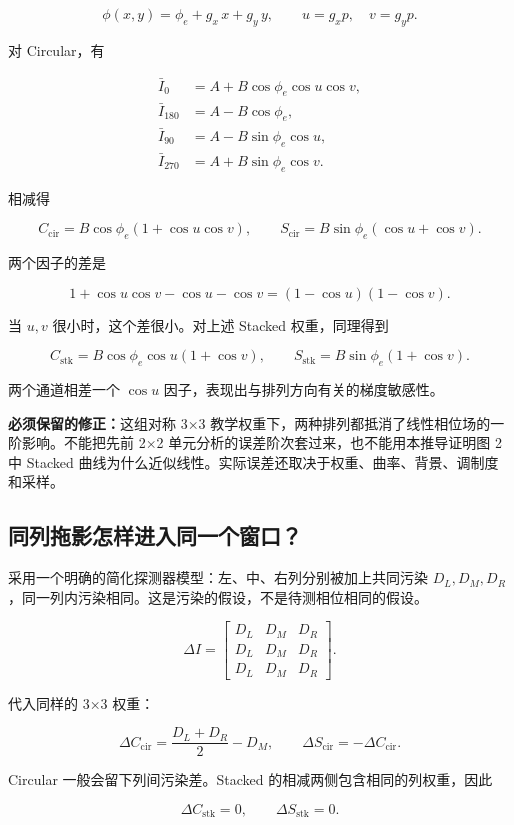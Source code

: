 \documentclass[UTF8,fontset=fandol,11pt,a4paper]{ctexart}
\begin{document}
\[
\phi(x,y)=\phi_e+g_x\,x+g_y\,y,\qquad u=g_xp,\quad v=g_yp.
\]

对 Circular，有

\[
\begin{aligned}
\bar I_0&=A+B\cos\phi_e\cos u\cos v,\\
\bar I_{180}&=A-B\cos\phi_e,\\
\bar I_{90}&=A-B\sin\phi_e\cos u,\\
\bar I_{270}&=A+B\sin\phi_e\cos v.
\end{aligned}
\]

相减得

\[
C_{\mathrm{cir}}=B\cos\phi_e(1+\cos u\cos v),\qquad
S_{\mathrm{cir}}=B\sin\phi_e(\cos u+\cos v).
\]

两个因子的差是

\[
1+\cos u\cos v-\cos u-\cos v=(1-\cos u)(1-\cos v).
\]

当 \(u,v\) 很小时，这个差很小。对上述 Stacked 权重，同理得到

\[
C_{\mathrm{stk}}=B\cos\phi_e\cos u(1+\cos v),\qquad
S_{\mathrm{stk}}=B\sin\phi_e(1+\cos v).
\]

两个通道相差一个 \(\cos u\) 因子，表现出与排列方向有关的梯度敏感性。

\textbf{必须保留的修正：}这组对称 3×3 教学权重下，两种排列都抵消了线性相位场的一阶影响。不能把先前 2×2 单元分析的误差阶次套过来，也不能用本推导证明图 2 中 Stacked 曲线为什么近似线性。实际误差还取决于权重、曲率、背景、调制度和采样。

\subsection{同列拖影怎样进入同一个窗口？}

采用一个明确的简化探测器模型：左、中、右列分别被加上共同污染 \(D_L,D_M,D_R\)，同一列内污染相同。这是污染的假设，不是待测相位相同的假设。

\[
\Delta I=\begin{bmatrix}D_L&D_M&D_R\\D_L&D_M&D_R\\D_L&D_M&D_R\end{bmatrix}.
\]

代入同样的 3×3 权重：

\[
\Delta C_{\mathrm{cir}}=\frac{D_L+D_R}{2}-D_M,\qquad
\Delta S_{\mathrm{cir}}=-\Delta C_{\mathrm{cir}}.
\]

Circular 一般会留下列间污染差。Stacked 的相减两侧包含相同的列权重，因此

\[
\Delta C_{\mathrm{stk}}=0,\qquad\Delta S_{\mathrm{stk}}=0.
\]
\end{document}
